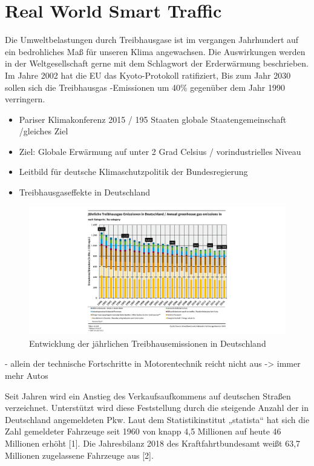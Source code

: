 \section{Real World Smart Traffic}

Die Umweltbelastungen durch Treibhausgase ist im vergangen Jahrhundert auf ein bedrohliches Maß für unseren Klima angewachsen. Die Auswirkungen werden in der Weltgesellschaft gerne mit dem Schlagwort der Erderwärmung beschrieben. Im Jahre 2002 hat die EU das Kyoto-Protokoll ratifiziert, Bis zum Jahr 2030 sollen sich die Treibhausgas -Emissionen um 40\% gegenüber dem Jahr 1990 verringern. 

\begin{itemize} 
\item Pariser Klimakonferenz 2015 / 195 Staaten globale Staatengemeinschaft  /gleiches Ziel
\item Ziel: Globale Erwärmung auf unter 2 Grad Celsius / vorindustrielles Niveau 
\item Leitbild für deutsche Klimaschutzpolitik der Bundesregierung
\item Treibhausgaseffekte in Deutschland
\end{itemize}

\begin{figure}[ht]
	\includegraphics[width=\textwidth]{images/jaehrlicheTreibhausEmissionen.png}
	\caption{Entwicklung der jährlichen Treibhausemissionen in Deutschland}
	\label{fig2}
\end{figure}

-	allein der technische Fortschritte in Motorentechnik reicht nicht aus -> immer mehr Autos

Seit Jahren wird ein Anstieg des Verkaufsaufkommens auf deutschen Straßen verzeichnet. Unterstützt wird diese Feststellung durch die steigende Anzahl der in Deutschland angemeldeten Pkw. Laut dem Statistikinstitut „statista“ hat sich die Zahl gemeldeter Fahrzeuge seit 1960 von knapp 4,5 Millionen auf heute 46 Millionen erhöht [1]. Die Jahresbilanz 2018 des Kraftfahrtbundesamt weißt 63,7 Millionen zugelassene Fahrzeuge aus [2].  

